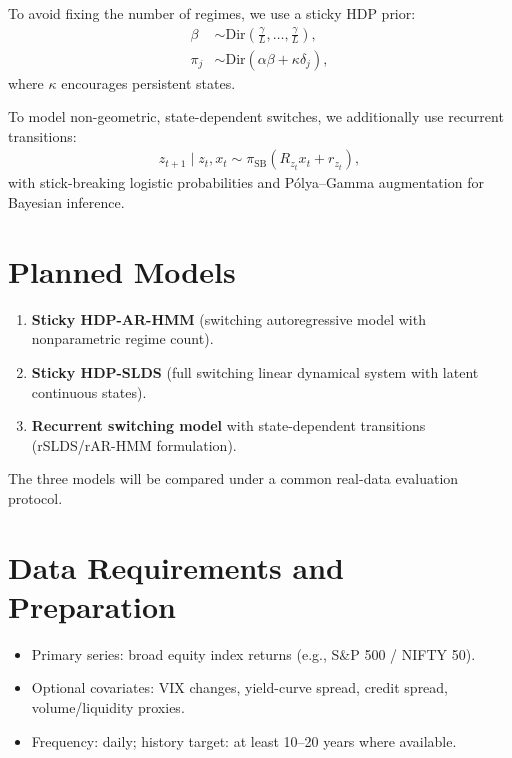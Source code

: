 \documentclass[11pt]{article}
\begin{document}
To avoid fixing the number of regimes, we use a sticky HDP prior:
\begin{align}
\beta &\sim \mathrm{Dir}\!\left(\tfrac{\gamma}{L},\dots,\tfrac{\gamma}{L}\right),\\
\pi_j &\sim \mathrm{Dir}(\alpha\beta + \kappa \delta_j),
\end{align}
where $\kappa$ encourages persistent states.

To model non-geometric, state-dependent switches, we additionally use recurrent transitions:
\begin{align}
z_{t+1}\mid z_t,x_t \sim \pi_{\mathrm{SB}}(R_{z_t}x_t + r_{z_t}),
\end{align}
with stick-breaking logistic probabilities and P{\'o}lya--Gamma augmentation for Bayesian inference.

\section{Planned Models}
\begin{enumerate}[leftmargin=1.5em]
    \item \textbf{Sticky HDP-AR-HMM} (switching autoregressive model with nonparametric regime count).
    \item \textbf{Sticky HDP-SLDS} (full switching linear dynamical system with latent continuous states).
    \item \textbf{Recurrent switching model} with state-dependent transitions (rSLDS/rAR-HMM formulation).
\end{enumerate}
The three models will be compared under a common real-data evaluation protocol.

\section{Data Requirements and Preparation}
\begin{itemize}[leftmargin=1.5em]
    \item Primary series: broad equity index returns (e.g., S\&P 500 / NIFTY 50).
    \item Optional covariates: VIX changes, yield-curve spread, credit spread, volume/liquidity proxies.
    \item Frequency: daily; history target: at least 10--20 years where available.
\end{itemize}
\end{document}
